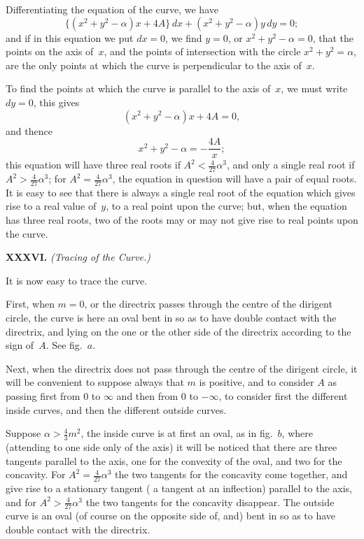 \documentclass[11pt,a4paper]{book}
\begin{document}
\begin{center}
Differentiating the equation of the curve, we have
\[
\{ (x^{2} + y^{2} - \alpha)x + 4A \}\, dx + (x^{2} + y^{2} - \alpha)y\, dy = 0;
\]
and if in this equation we put $dx = 0$, we find $y = 0$,
or $x^{2} + y^{2} - \alpha = 0$, \ie{} that the points on the axis of~$x$,
and the points of intersection with the circle $x^{2} + y^{2} = \alpha$,
are the only points at which the curve is perpendicular to the axis of~$x$.

To find the points at which the curve is parallel to the axis of~$x$,
we must write $dy = 0$, this gives
\[
(x^{2} + y^{2} - \alpha)x + 4A = 0,
\]
and thence
\[
x^{2} + y^{2} - \alpha = - \frac{4A}{x};
\]
this equation will have three real roots if $A^{2} < \tfrac{4}{27}\alpha^{3}$,
and only a single real root if $A^{2} > \tfrac{4}{27}\alpha^{3}$;
for $A^{2} = \tfrac{4}{27}\alpha^{3}$, the equation in question will have
a pair of equal roots.
It is easy to see that there is always a single real root of
the equation which gives rise to a real value of~$y$, \ie{} to a
real point upon the curve; but, when the equation has three
real roots, two of the roots may or may not give rise to real
points upon the curve.

\medskip\noindent\textbf{XXXVI.}
\textit{(Tracing of the Curve.)}

It is now easy to trace the curve.

First, when $m = 0$, or the directrix passes through the centre
of the dirigent circle, the curve is here an oval bent in so as
to have double contact with the directrix, and lying on the one
or the other side of the directrix according to the sign of~$A$.
See fig.~$a$.

Next, when the directrix does not pass through the centre of
the dirigent circle, it will be convenient to suppose always that
$m$ is positive, and to consider $A$ as passing first from $0$ to $\infty$
and then from $0$ to $-\infty$, \ie{} to consider first the different
inside curves, and then the different outside curves.

Suppose $\alpha > \tfrac{4}{3}m^{2}$, the inside curve is at first an oval,
as in fig.~$b$, where (attending to one side only of the axis)
it will be noticed that there are three tangents parallel to the
axis, \viz{} one for the convexity of the oval, and two for the concavity.
For $A^{2} = \tfrac{4}{27}\alpha^{3}$ the two tangents for the concavity come
together, and give rise to a stationary tangent (\ie{} a tangent
at an inflection) parallel to the axis, and for $A^{2} > \tfrac{4}{27}\alpha^{3}$
the two tangents for the concavity disappear.
The outside curve is an oval (of course on the opposite side
of, and) bent in so as to have double contact with the directrix.


\end{center}
\end{document}
